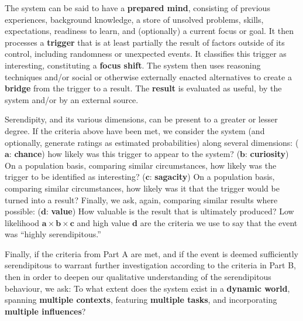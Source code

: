 \begin{description}[itemsep=4pt]
\item[{(\textbf{A - Definitional characteristics})}] {The system can
  be said to have a {\textbf{prepared mind}}, consisting of previous
  experiences, background knowledge, a store of unsolved problems,
  skills, expectations, readiness to learn, and (optionally) a current
  focus or goal.  It then processes a {\textbf{trigger}} that is at
  least partially the result of factors outside of its control,
  including randomness or unexpected events.  It classifies this
  trigger as interesting, constituting a {\textbf{focus shift}}.  The
  system then uses reasoning techniques and/or social or otherwise
  externally enacted alternatives to create a {\textbf{bridge}} from
  the trigger to a result.  The {\textbf{result}} is evaluated as
  useful, by the system and/or by an external source.}
\item[{(\textbf{B - Dimensions})}] {Serendipity, and its various
  dimensions, can be present to a greater or lesser degree.  If the
  criteria above have been met, we consider the system (and
  optionally, generate ratings as estimated probabilities) along
  several dimensions:
%
{($\mathbf{a}$: \textbf{chance})} how likely was this trigger to appear to
  the system?
%
{($\mathbf{b}$: \textbf{curiosity})} On a population basis, comparing
similar circumstances, how likely was the trigger to be identified as
interesting?
%
{($\mathbf{c}$: \textbf{sagacity})} On a population basis, comparing
similar circumstances, how likely was it that the trigger would be
turned into a result?
%
Finally, we ask, again, comparing similar results where possible:
{($\mathbf{d}$: \textbf{value})} How valuable is the result that
is ultimately produced?}
%
{Low likelihood $\mathbf{a}\times\mathbf{b}\times\mathbf{c}$ 
 and high value $\mathbf{d}$ are the criteria we use to say that the event was ``highly serendipitous.''}

\item[{(\textbf{C - Factors})}] {Finally, if the criteria from Part A
  are met, and if the event is deemed sufficiently serendipitous to
  warrant further investigation according to the criteria in Part B,
  then in order to deepen our qualitative understanding of the
  serendipitous behaviour, we ask: To what extent does the system
  exist in a {\textbf{dynamic world}}, spanning {\textbf{multiple
      contexts}}, featuring {\textbf{multiple tasks}}, and
  incorporating {\textbf{multiple influences}}?}
\end{description}


